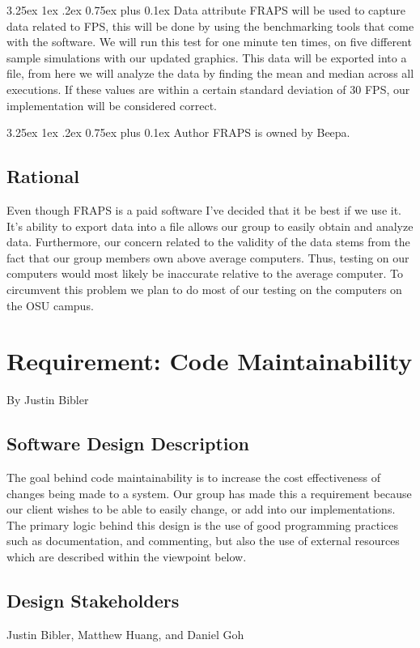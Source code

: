 \documentclass[10pt,journal,compsoc,draftclsnofoot]{IEEEtran}
\makeatletter
\newcommand\subparagraph{%
  \@startsection{subparagraph}{5}
  {\parindent}
  {3.25ex \@plus 1ex \@minus .2ex}
  {0.75ex plus 0.1ex}
  {\normalfont\normalsize\bfseries}}
\makeatother
\begin{document}
\begin{flushleft}
\subparagraph{Data attribute}
FRAPS will be used to capture data related to FPS, this will be done by using the benchmarking tools that come with the software.
We will run this test for one minute ten times, on five different sample simulations with our updated graphics.
This data will be exported into a file, from here we will analyze the data by finding the mean and median across all executions.
If these values are within a certain standard deviation of 30 FPS, our implementation will be considered correct.

\subparagraph{Author}
FRAPS is owned by Beepa.\cite{fraps}

\subsection{Rational}
Even though FRAPS is a paid software I've decided that it be best if we use it.
It's ability to export data into a file allows our group to easily obtain and analyze data.
Furthermore, our concern related to the validity of the data stems from the fact that our group members own above average computers.
Thus, testing on our computers would most likely be inaccurate relative to the average computer.
To circumvent this problem we plan to do most of our testing on the computers on the OSU campus.

\newpage

\section{Requirement: Code Maintainability}
\large{By Justin Bibler}

\normalsize
\subsection{Software Design Description}
The goal behind code maintainability is to increase the cost effectiveness of changes being made to a system. \cite{maintain}
Our group has made this a requirement because our client wishes to be able to easily change, or add into our implementations.
The primary logic behind this design is the use of good programming practices such as documentation, and commenting, but also the use of external resources which are described within the viewpoint below.

\subsection{Design Stakeholders}
Justin Bibler, Matthew Huang, and Daniel Goh


\end{flushleft}
\end{document}

